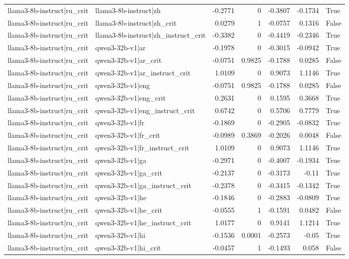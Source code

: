 \begin{table}
\begin{tabular}{l l r r r r l}
llama3-8b-instruct|ru_crit & llama3-8b-instruct|zh & -0.2771 & 0 & -0.3807 & -0.1734 & True \\
llama3-8b-instruct|ru_crit & llama3-8b-instruct|zh_crit & 0.0279 & 1 & -0.0757 & 0.1316 & False \\
llama3-8b-instruct|ru_crit & llama3-8b-instruct|zh_instruct_crit & -0.3382 & 0 & -0.4419 & -0.2346 & True \\
llama3-8b-instruct|ru_crit & qwen3-32b-v1|ar & -0.1978 & 0 & -0.3015 & -0.0942 & True \\
llama3-8b-instruct|ru_crit & qwen3-32b-v1|ar_crit & -0.0751 & 0.9825 & -0.1788 & 0.0285 & False \\
llama3-8b-instruct|ru_crit & qwen3-32b-v1|ar_instruct_crit & 1.0109 & 0 & 0.9073 & 1.1146 & True \\
llama3-8b-instruct|ru_crit & qwen3-32b-v1|eng & -0.0751 & 0.9825 & -0.1788 & 0.0285 & False \\
llama3-8b-instruct|ru_crit & qwen3-32b-v1|eng_crit & 0.2631 & 0 & 0.1595 & 0.3668 & True \\
llama3-8b-instruct|ru_crit & qwen3-32b-v1|eng_instruct_crit & 0.6742 & 0 & 0.5706 & 0.7779 & True \\
llama3-8b-instruct|ru_crit & qwen3-32b-v1|fr & -0.1869 & 0 & -0.2905 & -0.0832 & True \\
llama3-8b-instruct|ru_crit & qwen3-32b-v1|fr_crit & -0.0989 & 0.3869 & -0.2026 & 0.0048 & False \\
llama3-8b-instruct|ru_crit & qwen3-32b-v1|fr_instruct_crit & 1.0109 & 0 & 0.9073 & 1.1146 & True \\
llama3-8b-instruct|ru_crit & qwen3-32b-v1|ga & -0.2971 & 0 & -0.4007 & -0.1934 & True \\
llama3-8b-instruct|ru_crit & qwen3-32b-v1|ga_crit & -0.2137 & 0 & -0.3173 & -0.11 & True \\
llama3-8b-instruct|ru_crit & qwen3-32b-v1|ga_instruct_crit & -0.2378 & 0 & -0.3415 & -0.1342 & True \\
llama3-8b-instruct|ru_crit & qwen3-32b-v1|he & -0.1846 & 0 & -0.2883 & -0.0809 & True \\
llama3-8b-instruct|ru_crit & qwen3-32b-v1|he_crit & -0.0555 & 1 & -0.1591 & 0.0482 & False \\
llama3-8b-instruct|ru_crit & qwen3-32b-v1|he_instruct_crit & 1.0177 & 0 & 0.9141 & 1.1214 & True \\
llama3-8b-instruct|ru_crit & qwen3-32b-v1|hi & -0.1536 & 0.0001 & -0.2573 & -0.05 & True \\
llama3-8b-instruct|ru_crit & qwen3-32b-v1|hi_crit & -0.0457 & 1 & -0.1493 & 0.058 & False \\

\end{tabular}
\end{table}
